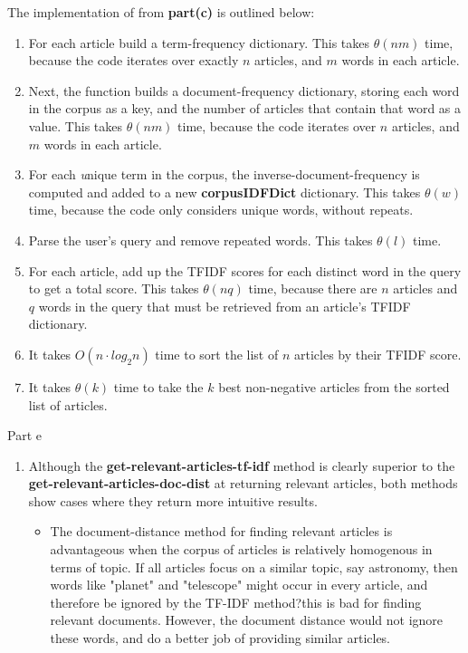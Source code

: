 \documentclass[12pt,twoside]{article}
\begin{document}
\begin{problems}
\begin{problemparts}
\vspace{5mm}

The implementation of {\bf \functionc} from {\bf part(c)} is outlined below:
\begin{enumerate}
	\item For each article build a term-frequency dictionary. This takes $\theta(nm)$ time, because the code iterates over exactly $n$ articles, and $m$ words in each article.
	\item Next, the function builds a document-frequency dictionary, storing each word in the corpus as a key, and the number of articles that contain that word as a value. This takes $\theta(nm)$ time, because the code iterates over $n$ articles, and $m$ words in each article.
	\item For each {\textit unique} term in the corpus, the inverse-document-frequency is computed and added to a new {\bf corpusIDFDict} dictionary. This takes $\theta(w)$ time, because the code only considers unique words, without repeats.
	\item Parse the user's query and remove repeated words. This takes $\theta(l)$ time.
	\item For each article, add up the TFIDF scores for each distinct word in the query to get a total score. This takes $\theta(nq)$ time, because there are $n$ articles and $q$ words in the query that must be retrieved from an article's TFIDF dictionary.
	\item It takes $O(n \cdot log_2n)$ time to sort the list of $n$ articles by their TFIDF score.
	\item It takes $\theta(k)$ time to take the $k$ best non-negative articles from the sorted list of articles.
\end{enumerate}

\vspace{5mm}

\problempart Part e %
\begin{enumerate}
	\item Although the {\bf get-relevant-articles-tf-idf} method is clearly superior to the {\bf get-relevant-articles-doc-dist} at returning relevant articles, both methods show cases where they return more intuitive results.
	\begin{itemize}
		\item The document-distance method for finding relevant articles is advantageous when the corpus of articles is relatively homogenous in terms of topic. If all articles focus on a similar topic, say astronomy, then words like "planet" and "telescope" might occur in every article, and therefore be ignored by the TF-IDF method?this is bad for finding relevant documents. However, the document distance would not ignore these words, and do a better job of providing similar articles.
		

\end{itemize}
\end{enumerate}
\end{problemparts}
\end{problems}
\end{document}
